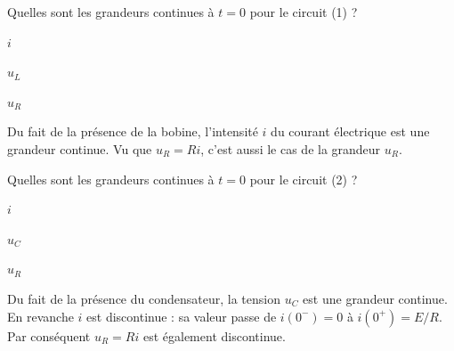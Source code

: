 \repriseEntrainement



\begin{enonce}
	Quelles sont les grandeurs continues à $t=0$ pour le circuit (1) ?
	\begin{listeQCM3Colonnes}
	\item $i$
	\item $u_L$
	\item $u_R$
	\end{listeQCM3Colonnes}
\end{enonce}
\begin{corrige}
Du fait de la présence de la bobine, l'intensité $i$ du courant électrique est une grandeur continue. Vu que $u_R=Ri$, c'est aussi le cas de la grandeur $u_R$.
\end{corrige}




\begin{enonce}
	Quelles sont les grandeurs continues à $t=0$ pour le circuit (2) ?
	
	\begin{listeQCM3Colonnes}
	\item $i$
	\item $u_C$
	\item $u_R$
	\end{listeQCM3Colonnes}
\end{enonce}
\reponse{\reponseB{}}
\begin{corrige}
Du fait de la présence du condensateur, la tension $u_C$ est une grandeur continue. En revanche $i$ est discontinue : sa valeur passe de $i(0^-)=0$ à $i(0^+)=E/R$. Par conséquent $u_R=Ri$ est également discontinue.
\end{corrige}


\newpage


\pauseEntrainement


